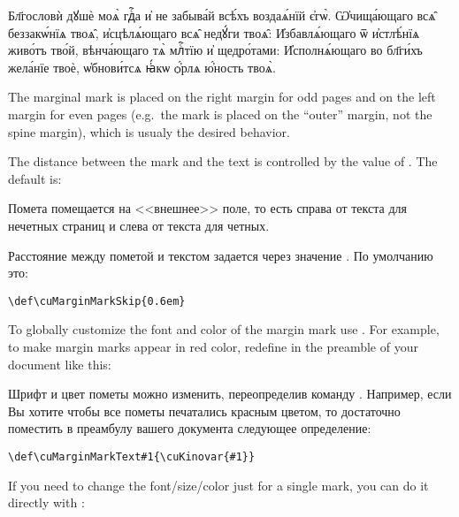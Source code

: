\begin{center}
\begin{churchslavonic}
\let\hMn=\cuMarginMark
\let\hKv=\cuKinovar
\parbox{0.75\textwidth}{%
  \textwidth
  \hMn{в҃}\hKv Бл҃гословѝ дꙋшѐ моѧ̀ гдⷭ҇а и҆ не забыва́й всѣ́хъ  воздаѧ́нїй є҆гѡ̀.
  \hMn{а҃}\hKv Ѡ҆чища́ющаго всѧ̑ беззакѡ́нїѧ твоѧ̑, и҆сцѣлѧ́ющаго  всѧ̑ недꙋ́ги твоѧ̑:
  \hMn{в҃}\hKv И҆збавлѧ́ющаго ѿ и҆стлѣ́нїѧ  живо́тъ тво́й, вѣнча́ющаго тѧ̀ млⷭ҇тїю и҆ щедро́тами:
  \hMn{а҃}\hKv И҆сполнѧ́ющаго во бл҃ги́хъ жела́нїе твоѐ, ѡ҆бнови́тсѧ  ꙗ҆́кѡ ѻ҆́рлѧ ю҆́ность твоѧ̀.
}
\end{churchslavonic}
\end{center}

\begin{EN}
The marginal mark is placed on the right margin for odd pages
and on the left margin for even pages (e.g.~the mark is placed on the
``outer'' margin, not the spine margin), which is usualy the desired behavior.

The distance between the mark and the text is controlled by the value
of . The default is:
\end{EN}
%
\begin{RU}
Помета помещается на <<внешнее>> поле, то есть справа от текста для нечетных страниц и слева от текста для четных.

Расстояние между пометой и текстом задается через значение . По умолчанию это:
\end{RU}
%
\begin{verbatim}
\def\cuMarginMarkSkip{0.6em}
\end{verbatim}

\begin{EN}
To globally customize the font and color of the margin mark use .
For example, to make margin marks appear in red color, redefine  in the preamble of your
document like this:
\end{EN}
%
\begin{RU}
Шрифт и цвет пометы можно изменить, переопределив команду .
Например, если Вы хотите чтобы все пометы печатались красным цветом, то достаточно поместить
в преамбулу вашего документа следующее определение:
\end{RU}
\begin{verbatim}
\def\cuMarginMarkText#1{\cuKinovar{#1}}
\end{verbatim}

\begin{EN}
If you need to change the font/size/color just for a single mark, you can do it directly with :
\end{EN}

